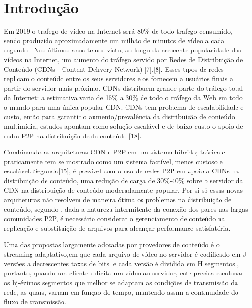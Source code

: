 \documentclass[
	12pt,
	oneside,
	a4paper,
	english,
	brazil
	]{abntex2ppgsi}
\begin{document}
\frenchspacing 
\imprimircapa
\setlength{\absparsep}{18pt}
\begin{resumo}
\end{resumo}

\chapter{Introdução}

Em 2019 o trafego de vídeo na Internet será 80\% de todo trafego consumido, sendo produzido aproximadamente um milhão de minutos de vídeo a cada segundo \cite{CISCO2015}. Nos últimos anos temos visto, ao longo da crescente popularidade dos vídeos na Internet, um aumento do tráfego servido por Redes de Distribuição de Conteúdo (CDNs - Content Delivery Network) [7],[8]. 
Esses tipos de redes replicam o conteúdo entre os seus servidores e os fornecem a usuários finais a partir do servidor mais próximo. CDNs distribuem grande parte do tráfego total da Internet: a estimativa varia de 15\% a 30\% de todo o tráfego da Web em todo o mundo para uma única popular CDN. 
CDNs tem problema de escalabilidade e custo, então para garantir o aumento/prevalência da distribuição de conteúdo multimídia, estudos apontam como solução escalável e de baixo custo o apoio de redes P2P na distribuição deste conteúdo [18].

Combinando as arquiteturas CDN e P2P em um sistema híbrido; teórica e praticamente tem se mostrado como um sistema factível, menos custoso e escalável. Segundo[15], é possível com o uso de redes P2P em apoio a CDNs na distribuição de conteúdo, uma redução de carga de 30\%-40\% sobre o servidor da CDN na distribuição de conteúdo moderadamente popular.
Por si só essas novas arquiteturas não resolvem de maneira ótima os problemas na distribuição de conteúdo, segundo \cite{Kangasharju2007}, dada a natureza intermitente da conexão dos pares nas largas comunidades P2P, é necessário considerar o gerenciamento de conteúdo na replicação e substituição de arquivos para alcançar performance satisfatória.

Uma das propostas largamente adotadas por provedores de conteúdo é o streaming adaptativo,em que cada arquivo de vídeo no servidor é codificado em J versões a decrescentes taxas de bits, e cada versão é dividida em H segmentos \cite{Tian2013}, portanto, quando um cliente solicita um vídeo ao servidor, este precisa escalonar os hj-ézimos segmentos que melhor se adaptam as condições de transmissão da rede, as quais, variam em função do tempo, mantendo assim a continuidade do fluxo de transmissão.
\end{document}

